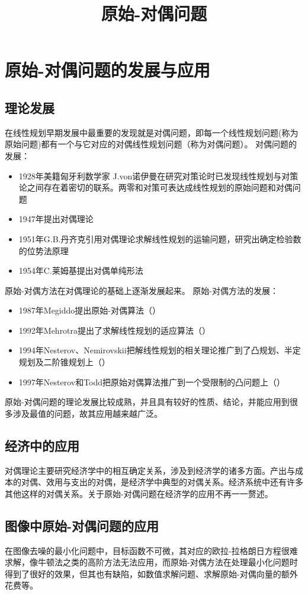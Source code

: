 \documentclass[a4paper,12pt]{article}
\title{原始-对偶问题}
\author{}
\date{}
\begin{document}
\maketitle
\section{原始-对偶问题的发展与应用}
\subsection{理论发展}
在线性规划早期发展中最重要的发现就是对偶问题，即每一个线性规划问题(称为原始问题)都有一个与它对应的对偶线性规划问题（称为对偶问题）。
对偶问题的发展：
\begin{itemize}
\item 1928年美籍匈牙利数学家 J.von诺伊曼在研究对策论时已发现线性规划与对策论之间存在着密切的联系。两零和对策可表达成线性规划的原始问题和对偶问题
\item 1947年提出对偶理论
\item 1951年G.B.丹齐克引用对偶理论求解线性规划的运输问题，研究出确定检验数的位势法原理
\item 1954年C.莱姆基提出对偶单纯形法
\end{itemize}
原始-对偶方法在对偶理论的基础上逐渐发展起来。
原始-对偶方法的发展：
\begin{itemize}
\item 1987年Megiddo提出原始-对偶算法（\cite{NM}）
\item 1992年Mehrotra提出了求解线性规划的适应算法（\cite{SM}）
\item 1994年Nesterov、Nemirovskii把解线性规划的相关理论推广到了凸规划、半定规划及二阶锥规划上（\cite{NN}）
\item 1997年Nesterov和Todd把原始对偶算法推广到一个受限制的凸问题上（\cite{NT}）
\end{itemize}
原始-对偶问题的理论发展比较成熟，并且具有较好的性质、结论，并能应用到很多涉及最值的问题，故其应用越来越广泛。

\subsection{经济中的应用}
对偶理论主要研究经济学中的相互确定关系，涉及到经济学的诸多方面。产出与成本的对偶、效用与支出的对偶，是经济学中典型的对偶关系。经济系统中还有许多其他这样的对偶关系。关于原始-对偶问题在经济学的应用不再一一赘述。
\subsection{图像中原始-对偶问题的应用}
在图像去噪的最小化问题中，目标函数不可微，其对应的欧拉-拉格朗日方程很难求解，像牛顿法之类的高阶方法无法应用，而原始-对偶方法在处理最小化问题时得到了很好的效果，但其也有缺陷，如数值求解问题、求解原始-对偶向量的额外花费等。
\end{document}
